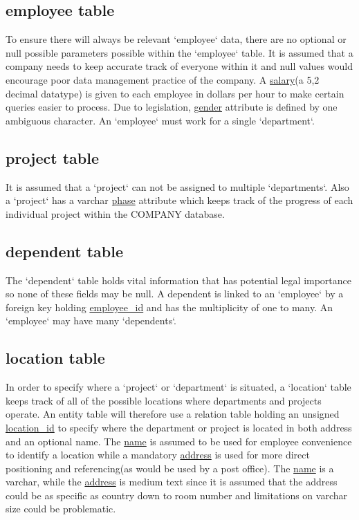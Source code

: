 \documentclass[11pt,letterpaper]{article}
\begin{document}
	\subsection{employee table}
	To ensure there will always be relevant `employee` data, there are no optional or null possible parameters possible within the `employee`  table. It is assumed that a company needs to keep accurate track of everyone within it and null values would encourage poor data management practice of the company. A \uline{salary}(a 5,2 decimal datatype) is given to each employee in dollars per hour to make certain queries easier to process. Due to legislation, \uline{gender} attribute is defined by one ambiguous character. An `employee` must work for a single `department`.\\
	
		\subsection{project table}
	 It is assumed that a `project` can not be assigned to multiple `departments`. Also a `project` has a varchar \uline{phase} attribute which keeps track of the progress of each individual project within the COMPANY database.\\

		\subsection{dependent table}
The `dependent` table holds vital information that has potential legal importance so none of these fields may be null. A dependent is linked to an `employee` by a foreign key holding \uline{employee\_id} and has the multiplicity of one to many. An `employee` may have many `dependents`. \\

\subsection{location table}
In order to specify where a `project` or `department` is situated, a `location` table keeps track of all of the possible locations where departments and projects operate. An entity table will therefore use a relation table holding an unsigned \uline{location\_id} to specify where the department or project is located in both address and an optional name. The \uline{name} is assumed to be used for employee convenience to identify a location while a mandatory \uline{address} is used for more direct positioning and referencing(as would be used by a post office). The \uline{name} is a varchar, while the \uline{address} is medium text since it is assumed that the address could be as specific as country down to room number and limitations on varchar size could be problematic.\\
\end{document}
